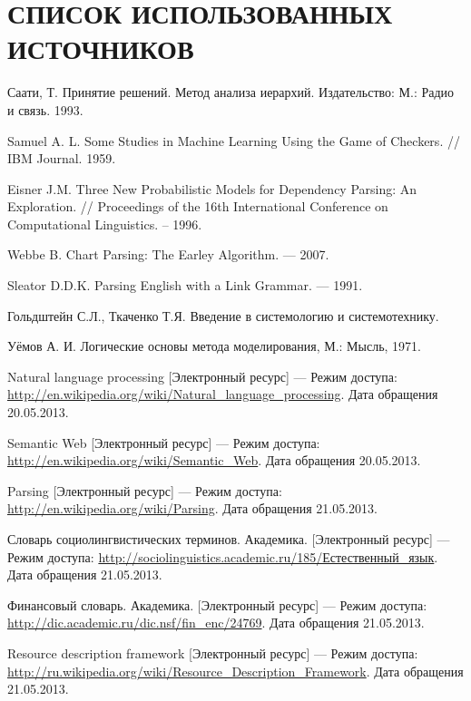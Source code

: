 \renewcommand*{\refname}{}
\section*{\centering СПИСОК ИСПОЛЬЗОВАННЫХ ИСТОЧНИКОВ}
\begin{thebibliography}{99}	
	Саати, Т. Принятие решений. Метод анализа иерархий. Издательство: М.: Радио и связь. 1993.	

	Samuel A. L. Some Studies in Machine Learning Using the Game of Checkers. // IBM Journal. 1959.

	Eisner J.M. Three New Probabilistic Models for Dependency Parsing: An Exploration. // Proceedings of the 16th International Conference on Computational Linguistics. – 1996.

	Webbe B. Chart Parsing: The Earley Algorithm. --- 2007.

	Sleator D.D.K. Parsing English with a Link Grammar. --- 1991.

	Гольдштейн С.Л., Ткаченко Т.Я. Введение в системологию и системотехнику.

	Уёмов А. И. Логические основы метода моделирования, М.: Мысль, 1971.

	Natural language processing [Электронный ресурс] --- Режим доступа: \url{http://en.wikipedia.org/wiki/Natural_language_processing}. Дата обращения 20.05.2013.

	Semantic Web [Электронный ресурс] --- Режим доступа: \url{http://en.wikipedia.org/wiki/Semantic_Web}. Дата обращения 20.05.2013.

	Parsing [Электронный ресурс] --- Режим доступа: \url{http://en.wikipedia.org/wiki/Parsing}. Дата обращения 21.05.2013.

	Словарь социолингвистических терминов. Академика. [Электронный ресурс] --- Режим доступа: \url{http://sociolinguistics.academic.ru/185/Естественный_язык}. Дата обращения 21.05.2013.

	Финансовый словарь. Академика. [Электронный ресурс] --- Режим доступа: \url{http://dic.academic.ru/dic.nsf/fin_enc/24769}. Дата обращения 21.05.2013.

	Resource description framework [Электронный ресурс] --- Режим доступа: \url{http://ru.wikipedia.org/wiki/Resource_Description_Framework}. Дата обращения 21.05.2013.


\end{thebibliography}
